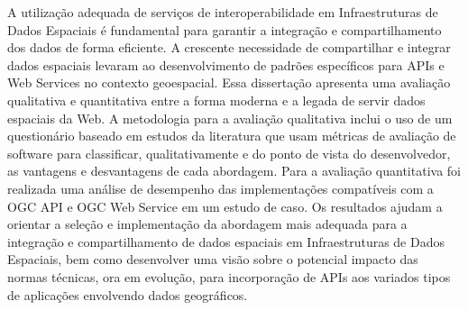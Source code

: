 A utilização adequada de serviços de interoperabilidade em Infraestruturas de Dados Espaciais é fundamental para garantir a integração e compartilhamento dos dados de forma eficiente. A crescente necessidade de compartilhar e integrar dados espaciais levaram ao desenvolvimento de padrões específicos para APIs e Web Services no contexto geoespacial. Essa dissertação apresenta uma avaliação qualitativa e quantitativa entre a forma moderna e a legada de servir dados espaciais da Web. 
A metodologia para a avaliação qualitativa inclui o uso de um questionário baseado em estudos da literatura que usam métricas de avaliação de software para classificar, qualitativamente e do ponto de vista do desenvolvedor, as vantagens e desvantagens de cada abordagem.
Para a avaliação quantitativa foi realizada uma análise de desempenho das implementações compatíveis com a OGC API e OGC Web Service em um estudo de caso. Os resultados ajudam a orientar a seleção e implementação da abordagem mais adequada para a integração e compartilhamento de dados espaciais em Infraestruturas de Dados Espaciais, bem como desenvolver uma visão sobre o potencial impacto das normas técnicas, ora em evolução, para incorporação de APIs aos variados tipos de aplicações envolvendo dados geográficos.


